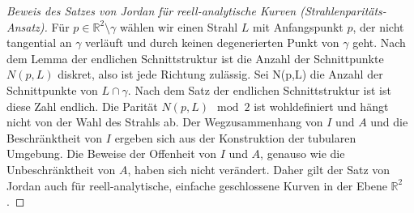 \begin{proof}[Beweis des Satzes von Jordan für reell-analytische Kurven (Strahlenparitäts-Ansatz)\label{jordan:proof:jordan_reell_analytische_kurven_strahlenparitaet}]
    Für $p \in \mathbb{R}^2 \setminus \gamma$ wählen wir einen Strahl $L$ mit Anfangspunkt $p$, der nicht tangential an $\gamma$ verläuft und durch keinen degenerierten Punkt von $\gamma$ geht.
    Nach dem Lemma der endlichen Schnittstruktur ist die Anzahl der Schnittpunkte $N(p,L)$ diskret, also ist jede Richtung zulässig. 
    Sei N(p,L) die Anzahl der Schnittpunkte von $L \cap \gamma$. Nach dem Satz der endlichen Schnittstruktur ist ist diese Zahl endlich. 
    Die Parität $N(p,L) \mod 2$ ist wohldefiniert und hängt nicht von der Wahl des Strahls ab. 
    Der Wegzusammenhang von $I$ und $A$ und die Beschränktheit von $I$ ergeben sich aus der Konstruktion der tubularen Umgebung. 
    Die Beweise der Offenheit von $I$ und $A$, genauso wie die Unbeschränktheit von $A$, haben sich nicht verändert.
    Daher gilt der Satz von Jordan auch für reell-analytische, einfache geschlossene Kurven in der Ebene $\mathbb{R}^2$.
\end{proof}